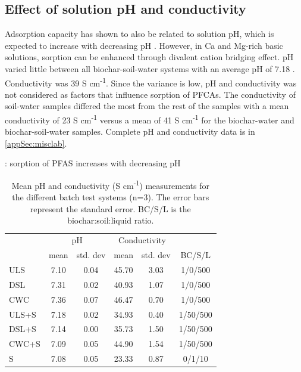 \subsection{Effect of solution pH and conductivity}
Adsorption capacity has shown to also be related to solution pH, which is expected to increase with decreasing pH \citep{du2014adsorption}. However, in Ca and Mg-rich basic solutions, sorption can be enhanced through divalent cation bridging effect. pH varied little between all biochar-soil-water systems with an average pH of 7.18 . Conductivity was 39  \textmu S cm\textsuperscript{-1}. Since the variance is low, pH and conductivity was not considered as factors that influence sorption of PFCAs. The conductivity of soil-water samples differed the most from the rest of the samples with a mean conductivity of 23  \textmu S cm\textsuperscript{-1} versus a mean of 41  \textmu S cm\textsuperscript{-1} for the biochar-water and biochar-soil-water samples. Complete pH and conductivity data is in \cref{appSec:misclab}.

\citep{zhang2013sorption}: sorption of PFAS increases with decreasing pH

\begin{table}
\centering
\caption{Mean pH and conductivity (\textmu S cm\textsuperscript{-1}) measurements for the different batch test systems (n=3). The error bars represent the standard error. BC/S/L is the biochar:soil:liquid ratio.}
\label{tab:pHcond}
\begin{tabular}{lccccc}
\toprule
 & \multicolumn{2}{c}{pH} & \multicolumn{2}{c}{Conductivity} & \\ \cline{2-5}
 & mean & std. dev & mean & std. dev & BC/S/L\\ 
\midrule
ULS & 7.10 & 0.04 & 45.70 & 3.03 & 1/0/500\\
DSL & 7.31 & 0.02 & 40.93 & 1.07 & 1/0/500\\
CWC & 7.36 & 0.07 & 46.47 & 0.70 & 1/0/500\\
ULS+S & 7.18 & 0.02 & 34.93 & 0.40 & 1/50/500\\
DSL+S & 7.14 & 0.00 & 35.73 & 1.50 & 1/50/500\\
CWC+S & 7.09 & 0.05 & 44.90 & 1.54 & 1/50/500\\
S & 7.08 & 0.05 & 23.33 & 0.87 & 0/1/10\\
\bottomrule
\end{tabular}
\end{table}



